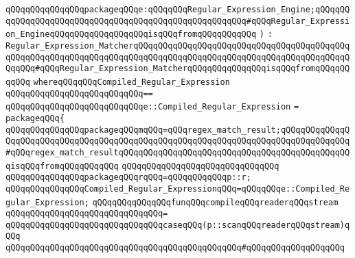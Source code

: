 \verb|qQQqqQQqqQQqqQQqpackageqQQqe:qQQqqQQqRegular_Expression_Engine;qQQqqQQqqQQqqQQqqQQqqQQqqQQqqQQqqQQqqQQqqQQqqQQqqQQqqQQq#qQQqRegular_Expression_EngineqQQqqQQqqQQqqQQqqQQqisqQQqfromqQQqqQQqqQQq|\newline
\verb|)|\newline
\verb|:|\newline
\verb|Regular_Expression_MatcherqQQqqQQqqQQqqQQqqQQqqQQqqQQqqQQqqQQqqQQqqQQqqQQqqQQqqQQqqQQqqQQqqQQqqQQqqQQqqQQqqQQqqQQqqQQqqQQqqQQqqQQqqQQqqQQqqQQqqQQq#qQQqRegular_Expression_MatcherqQQqqQQqqQQqqQQqisqQQqfromqQQqqQQqqQQq|\newline
\verb|whereqQQqqQQqCompiled_Regular_Expression|\newline
\verb|qQQqqQQqqQQqqQQqqQQqqQQqqQQq==|\newline
\verb|qQQqqQQqqQQqqQQqqQQqqQQqqQQqe::Compiled_Regular_Expression|\newline
\verb|=|\newline
\verb|packageqQQq{|\newline
\newline
\verb|qQQqqQQqqQQqqQQqpackageqQQqmqQQq=qQQqregex_match_result;qQQqqQQqqQQqqQQqqQQqqQQqqQQqqQQqqQQqqQQqqQQqqQQqqQQqqQQqqQQqqQQqqQQqqQQqqQQqqQQqqQQq#qQQqregex_match_resultqQQqqQQqqQQqqQQqqQQqqQQqqQQqqQQqqQQqqQQqqQQqqQQqisqQQqfromqQQqqQQqqQQq|\newline
\verb|qQQqqQQqqQQqqQQqqQQqqQQqqQQqqQQq|\newline
\verb|qQQqqQQqqQQqqQQqpackageqQQqrqQQq=qQQqqQQqqQQqp::r;|\newline
\newline
\verb|qQQqqQQqqQQqqQQqCompiled_Regular_ExpressionqQQq=qQQqqQQqe::Compiled_Regular_Expression;|\newline
\newline
\verb|qQQqqQQqqQQqqQQqfunqQQqcompileqQQqreaderqQQqstream|\newline
\verb|qQQqqQQqqQQqqQQqqQQqqQQqqQQqqQQq=|\newline
\verb|qQQqqQQqqQQqqQQqqQQqqQQqqQQqqQQqcaseqQQq(p::scanqQQqreaderqQQqstream)qQQq|\newline
\verb|qQQqqQQqqQQqqQQqqQQqqQQqqQQqqQQqqQQqqQQqqQQqqQQq#qQQqqQQqqQQqqQQqqQQq|\newline
